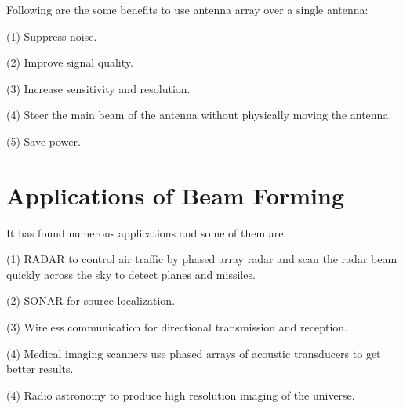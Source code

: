 Following are the some benefits to use antenna array over a single antenna:

(1) Suppress noise.

(2) Improve signal quality.

(3) Increase sensitivity and resolution.

(4) Steer the main beam of the antenna without physically moving the antenna.

(5) Save power.

\section{Applications of Beam Forming}

It has found numerous applications and some of them are:

(1) RADAR to control air traffic by phased array radar and scan the radar beam quickly across the sky to detect planes and missiles.

(2) SONAR for source localization.

(3) Wireless communication for directional transmission and reception.

(4) Medical imaging scanners use phased arrays of acoustic transducers to get better results.

(4) Radio astronomy to produce high resolution imaging of the universe. 
